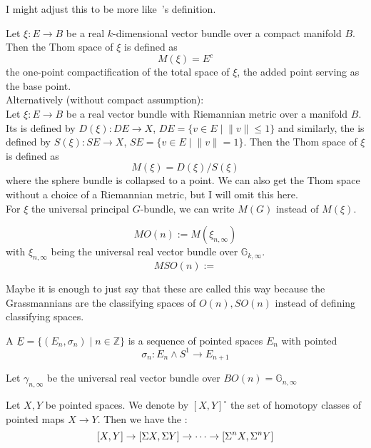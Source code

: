 \documentclass[a4paper,11pt]{article}
\begin{document}
I might adjust this to be more like\ \cite{thom}'s definition.
\begin{definition}
    Let \(\xi:E\to B\) be a real \(k\)-dimensional vector bundle over a compact manifold \(B\).
    Then the Thom space of \(\xi\) is defined as\[M(\xi)=E^c\] the one-point compactification of the total space of \(\xi\), the added point serving as the base point.\\
    Alternatively (without compact assumption):\\
    Let \(\xi:E\to B\) be a real vector bundle with Riemannian metric over a manifold \(B\). Its  is defined by \(D(\xi):DE\to X\), \(DE=\{v\in E\mid \lVert v\rVert \leq 1\}\) and similarly, the  is defined by \(S(\xi):SE\to X\), \(SE=\{v\in E\mid \lVert v\rVert = 1\}\). Then the Thom space of \(\xi\) is defined as
    \[M(\xi)=D(\xi)\big/S(\xi)\]
    where the sphere bundle is collapsed to a point. We can also get the Thom space without a choice of a Riemannian metric, but I will omit this here.\\
    For \(\xi\) the universal principal \(G\)-bundle, we can write \(M(G)\) instead of \(M(\xi)\).
\end{definition}

\begin{definition}
    \[MO(n):=M(\xi_{n,\infty})\] with \(\xi_{n,\infty}\) being the universal real vector bundle over \(\mathbb{G}_{k,\infty}\).
    \[MSO(n):=  \]
\end{definition}
Maybe it is enough to just say that these are called this way because the Grassmannians are the classifying spaces of \(O(n), SO(n)\) instead of defining classifying spaces.

\begin{definition}
    A  \(\underline E = \{(E_n,\sigma_n)\mid n\in\mathbb{Z}\}\) is a sequence of pointed spaces \(E_n\) with pointed \[\sigma_n:E_n\wedge{S^1}\to E_{n+1}\]
\end{definition}

\begin{definition}
    Let \(\gamma_{n,\infty}\) be the universal real vector bundle over \(BO(n)=\mathbb{G}_{n,\infty}\)
\end{definition}

\begin{theorem}\label{suspension}
    Let \(X, Y\) be pointed spaces. We denote by \({[X,Y]}^\circ\) the set of homotopy classes of pointed maps \(X\to Y\). Then we have the :
    \[[X,Y]\to[\Sigma{X},\Sigma{Y}]\to\dots\to[\Sigma^n{X},\Sigma^n{Y}]\] 
\end{theorem}
\end{document}
